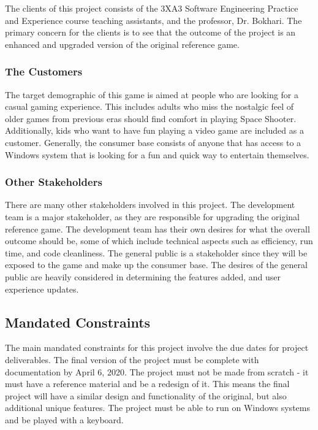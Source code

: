 \documentclass[12pt, titlepage]{article}
\begin{document}
The clients of this project consists of the 3XA3 Software Engineering Practice and Experience course teaching assistants, and the professor, Dr. Bokhari. The primary concern for the clients is to see that the outcome of the project is an enhanced and upgraded version of the original reference game. 

\subsubsection{The Customers}

The target demographic of this game is aimed at people who are looking for a casual gaming experience. This includes adults who miss the nostalgic feel of older games from previous eras should find comfort in playing Space Shooter. Additionally, kids who want to have fun playing a video game are included as a customer. Generally, the consumer base consists of anyone that has access to a Windows system that is looking for a fun and quick way to entertain themselves. 

\subsubsection{Other Stakeholders}

There are many other stakeholders involved in this project. The development team is a major stakeholder, as they are responsible for upgrading the original reference game. The development team has their own desires for what the overall outcome should be, some of which include technical aspects such as efficiency, run time, and code cleanliness. The general public is a stakeholder since they will be exposed to the game and make up the consumer base. The desires of the general public are heavily considered in determining the features added, and user experience updates. 

\subsection{Mandated Constraints}

The main mandated constraints for this project involve the due dates for project deliverables. The final version of the project must be complete with documentation by April 6, 2020. The project must not be made from scratch - it must have a reference material and be a redesign of it. This means the final project will have a similar design and functionality of the original, but also additional unique features. The project must be able to run on Windows systems and be played with a keyboard. 
\end{document}
